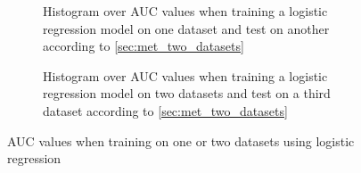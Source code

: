 {{{{{{\begin{figure}
    \begin{subfigure}[b]{0.5\textwidth}
        \caption{Histogram over AUC values when training a logistic regression model on one dataset and test on another according to \autoref{sec:met_two_datasets}}
        \label{fig:auc_single}
    \end{subfigure}
    \begin{subfigure}[b]{0.5\textwidth}
        \caption{Histogram over AUC values when training a logistic regression model on two datasets and test on a third dataset according to \autoref{sec:met_two_datasets}}
        \label{fig:auc_double}
    \end{subfigure}
    \caption{AUC values when training on one or two datasets using logistic regression}
    \label{fig:auc_hist_tripple}
\end{figure}

}}}}}}
